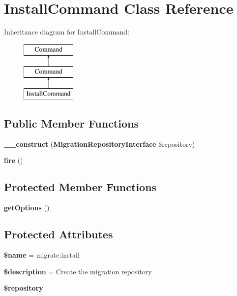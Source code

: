\section{Install\+Command Class Reference}
\label{class_illuminate_1_1_database_1_1_console_1_1_migrations_1_1_install_command}
Inheritance diagram for Install\+Command\+:\begin{figure}[H]
\begin{center}
\leavevmode
\includegraphics[height=3.000000cm]{class_illuminate_1_1_database_1_1_console_1_1_migrations_1_1_install_command}
\end{center}
\end{figure}
\subsection*{Public Member Functions}
\begin{DoxyCompactItemize}
\item 
{\bf \+\_\+\+\_\+construct} ({\bf Migration\+Repository\+Interface} \$repository)
\item 
{\bf fire} ()
\end{DoxyCompactItemize}
\subsection*{Protected Member Functions}
\begin{DoxyCompactItemize}
\item 
{\bf get\+Options} ()
\end{DoxyCompactItemize}
\subsection*{Protected Attributes}
\begin{DoxyCompactItemize}
\item 
{\bf \$name} = \textquotesingle{}migrate\+:install\textquotesingle{}
\item 
{\bf \$description} = \textquotesingle{}Create the migration repository\textquotesingle{}
\item 
{\bf \$repository}
\end{DoxyCompactItemize}


